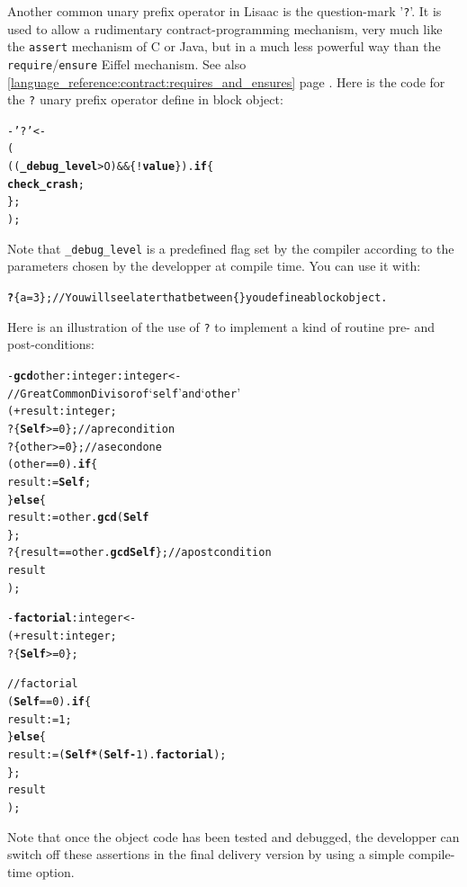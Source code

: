 \documentclass[11pt]{mybook}
\begin{document}
Another common unary prefix operator in Lisaac is the question-mark '{\tt ?}'.
It is used to allow a rudimentary 
contract-programming mechanism, very much like the {\tt{}assert}
mechanism of C or Java, but in a much less powerful way than the 
{\tt{}require}/{\tt{}ensure} Eiffel mechanism. See also \ref{language_reference:contract:requires_and_ensures} page \pageref{language_reference:contract:requires_and_ensures}.
Here is the code for the {\tt ?} unary prefix operator define in {\sc{}block} object:
\begin{alltt}
  - '?' <- 
   (
    (({\bf{}\_debug\_level} > O) && \{! {\bf{}value} \}).{\bf{}if} \{ 
      {\bf{}check\_crash}; 
    \};
   );
\end{alltt}
Note that {\tt \_debug\_level} is a predefined flag set by
the compiler according to the  parameters chosen by the developper at
compile time.
You can use it with:
\begin{alltt}
    {\bf{}?} \{a = 3\}; // You will see later that between \{\} you define a {\sc{}block} object.
\end{alltt}


Here is an illustration of the use of {\tt ?} to implement a kind of
routine pre- and post-conditions:

\begin{alltt} 
    - {\bf{}gcd} other:{\sc{}integer} :{\sc{}integer} <-
      // Great Common Divisor of `self' and `other'
      ( + result:{\sc{}integer};
        ? \{{\bf{}Self} >=0\};  // a precondition
        ? \{other>=0\};  // a second one
        (other == 0).{\bf{}if} \{
          result := {\bf{}Self};
        \} {\bf{}else} \{
          result := other.{\bf{}gcd} ({\bf{}Self} %
        \};
        ? \{result == other.{\bf{}gcd} {\bf{}Self}\}; // a postcondition
        result
      );
\end{alltt}

\label{code:recursive_fact_return}
\begin{alltt}
    - {\bf{}factorial}:{\sc{}integer} <- 
      ( + result:{\sc{}integer};
        ? \{{\bf{}Self}>=0\};
       
        // factorial
        ({\bf{}Self} == 0).{\bf{}if} \{
           result := 1;
        \} {\bf{}else} \{
           result := ({\bf{}Self} {\bf{*}} ({\bf{}Self} {\bf{-}} 1).{\bf{factorial}});
        \};
        result
      );
\end{alltt}

Note that once the object code has been tested and debugged, the
developper can switch off these 
assertions in the final delivery version by using a simple
compile-time option.
\end{document}

